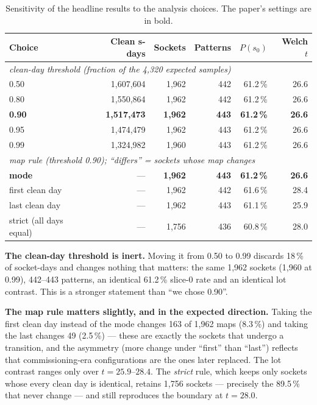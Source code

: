 \documentclass[10pt,conference]{IEEEtran}
\begin{document}
\begin{table}[h]\centering\caption{Sensitivity of the headline results to the analysis choices.
The paper's settings are in bold.}\label{tab:sens}
\footnotesize
\begin{tabular}{lrrrrr}\toprule
Choice & Clean s-days & Sockets & Patterns & $P(s_0)$ & Welch $t$\\\midrule
\multicolumn{6}{l}{\emph{clean-day threshold (fraction of the 4{,}320 expected samples)}}\\
0.50 & 1{,}607{,}604 & 1{,}962 & 442 & 61.2\,\% & 26.6\\
0.80 & 1{,}550{,}864 & 1{,}962 & 442 & 61.2\,\% & 26.6\\
\textbf{0.90} & \textbf{1{,}517{,}473} & \textbf{1{,}962} & \textbf{443} & \textbf{61.2\,\%} & \textbf{26.6}\\
0.95 & 1{,}474{,}479 & 1{,}962 & 443 & 61.2\,\% & 26.6\\
0.99 & 1{,}324{,}982 & 1{,}960 & 443 & 61.2\,\% & 26.6\\\midrule
\multicolumn{6}{l}{\emph{map rule (threshold 0.90); ``differs'' = sockets whose map changes}}\\
\textbf{mode} & --- & \textbf{1{,}962} & \textbf{443} & \textbf{61.2\,\%} & \textbf{26.6}\\
first clean day & --- & 1{,}962 & 442 & 61.6\,\% & 28.4\\
last clean day & --- & 1{,}962 & 443 & 61.1\,\% & 25.9\\
strict (all days equal) & --- & 1{,}756 & 436 & 60.8\,\% & 28.0\\
\bottomrule\end{tabular}\end{table}

\textbf{The clean-day threshold is inert.} Moving it from 0.50 to 0.99 discards 18\,\% of
socket-days and changes nothing that matters: the same 1{,}962 sockets (1{,}960 at 0.99), 442--443
patterns, an identical 61.2\,\% slice-0 rate and an identical lot contrast. This is a stronger
statement than ``we chose 0.90''.

\textbf{The map rule matters slightly, and in the expected direction.} Taking the first clean day
instead of the mode changes 163 of 1{,}962 maps (8.3\,\%) and taking the last changes 49
(2.5\,\%) --- these are exactly the sockets that undergo a transition, and the asymmetry (more
change under ``first'' than ``last'') reflects that commissioning-era configurations are the ones
later replaced. The lot contrast ranges only over $t=25.9$--$28.4$. The \emph{strict} rule, which
keeps only sockets whose every clean day is identical, retains 1{,}756 sockets --- precisely the
89.5\,\% that never change --- and still reproduces the boundary at $t=28.0$.
\end{document}

